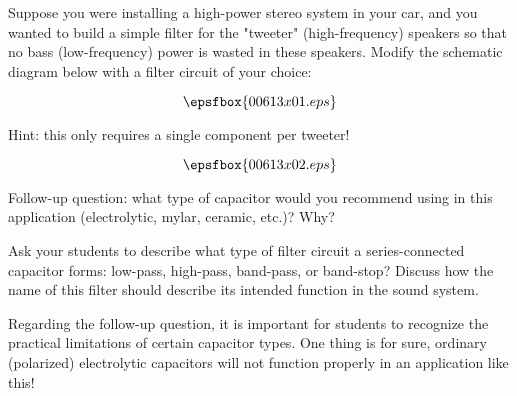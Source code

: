 

Suppose you were installing a high-power stereo system in your car, and you wanted to build a simple filter for the "tweeter" (high-frequency) speakers so that no bass (low-frequency) power is wasted in these speakers.  Modify the schematic diagram below with a filter circuit of your choice:

$$\epsfbox{00613x01.eps}$$

Hint: this only requires a single component per tweeter!







$$\epsfbox{00613x02.eps}$$

\vskip 10pt

Follow-up question: what type of capacitor would you recommend using in this application (electrolytic, mylar, ceramic, etc.)?  Why?







Ask your students to describe what type of filter circuit a series-connected capacitor forms: low-pass, high-pass, band-pass, or band-stop?  Discuss how the name of this filter should describe its intended function in the sound system.

Regarding the follow-up question, it is important for students to recognize the practical limitations of certain capacitor types.  One thing is for sure, ordinary (polarized) electrolytic capacitors will not function properly in an application like this!




